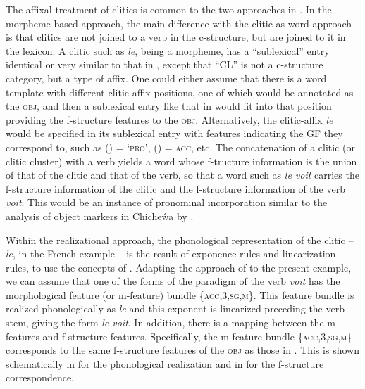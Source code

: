 \documentclass[output=paper,hidelinks]{langscibook}
\begin{document}
The affixal treatment of clitics is common to the two approaches in . In the morpheme-based approach, the main difference with the clitic-as-word approach is that clitics are not joined to a verb in the c-structure, but are joined to it in the lexicon. A clitic such as \textit{le}, being a morpheme, has a ``sublexical'' entry identical or very similar to that in , except that ``CL'' is not a c-structure category, but a type of affix. One could either assume that there is a word template with different clitic affix positions, one of which would be annotated as the \textsc{obj}, and then a sublexical entry like that in  would fit into that position providing the f-structure features to the \textsc{obj}. Alternatively, the clitic-affix \textit{le} would be specified in its sublexical entry with features indicating the GF they correspond to, such as (\UP\OBJ\PRED) = `\textsc{pro',} (\UP\OBJ\CASE) = \textsc{acc}, etc. The concatenation of a clitic (or clitic cluster) with a verb yields a word whose f-tructure information is the union of that of the clitic and that of the verb, so that a word such as \textit{le voit} carries the f-structure information of the clitic and the f-structure information of the verb \textit{voit}. This would be an instance of pronominal incorporation similar to the analysis of object markers in Chiche\^wa by \citet{BM87}.

Within the realizational approach, the phonological representation of the clitic -- \textit{le}, in the French example  -- is the result of exponence rules and linearization rules, to use the concepts of \citet{LuisSadler2003}. Adapting the approach of \citet{LuisSadler2003} to the present example, we can assume that one of the forms of the paradigm of the verb \textit{voit} has the morphological feature (or m-feature) bundle \textsc{\{acc,3,sg,m\}}. This feature bundle is realized phonologically as \textit{le} and this exponent is linearized preceding the verb stem, giving the form \textit{le voit}. In addition, there is a mapping between the m-features and f-structure features. Specifically, the m-feature bundle \textsc{\{acc,3,sg,m\}} corresponds to the same f-structure features of the \textsc{obj} as those in . This is shown schematically in  for the phonological realization and in  for the f-structure correspondence.
\end{document}
